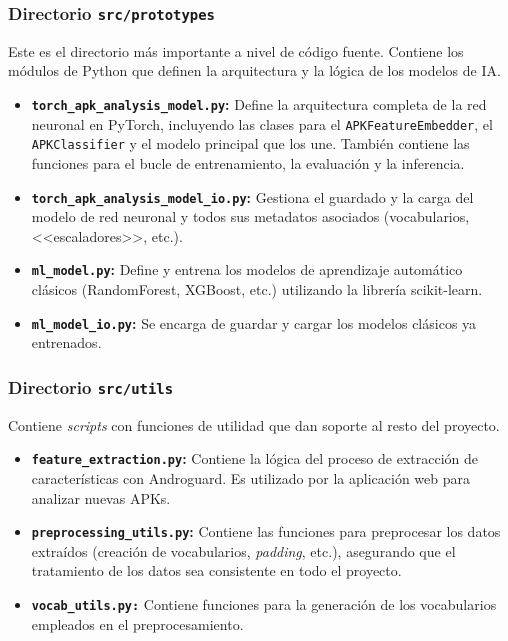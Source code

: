\subsubsection{Directorio \texttt{src/prototypes}}
Este es el directorio más importante a nivel de código fuente. Contiene los módulos de Python que definen la arquitectura y la lógica de los modelos de IA.
\begin{itemize}
	\item \textbf{\texttt{torch\_apk\_analysis\_model.py}:} Define la arquitectura completa de la red neuronal en PyTorch, incluyendo las clases para el \texttt{APKFeatureEmbedder}, el \texttt{APKClassifier} y el modelo principal que los une. También contiene las funciones para el bucle de entrenamiento, la evaluación y la inferencia.
	
	\item \textbf{\texttt{torch\_apk\_analysis\_model\_io.py}:} Gestiona el guardado y la carga del modelo de red neuronal y todos sus metadatos asociados (vocabularios, <<escaladores>>, etc.).
	
	\item \textbf{\texttt{ml\_model.py}:} Define y entrena los modelos de aprendizaje automático clásicos (RandomForest, XGBoost, etc.) utilizando la librería scikit-learn.
	
	\item \textbf{\texttt{ml\_model\_io.py}:} Se encarga de guardar y cargar los modelos clásicos ya entrenados.
\end{itemize}

\subsubsection{Directorio \texttt{src/utils}}
Contiene \textit{scripts} con funciones de utilidad que dan soporte al resto del proyecto.
\begin{itemize}
	\item \textbf{\texttt{feature\_extraction.py}:} Contiene la lógica del proceso de extracción de características con Androguard. Es utilizado por la aplicación web para analizar nuevas APKs.
	
	\item \textbf{\texttt{preprocessing\_utils.py}:} Contiene las funciones para preprocesar los datos extraídos (creación de vocabularios, \textit{padding}, etc.), asegurando que el tratamiento de los datos sea consistente en todo el proyecto.
	
	\item  \textbf\texttt{{vocab\_utils.py}:} Contiene funciones para la generación de los vocabularios empleados en el preprocesamiento.
\end{itemize}

